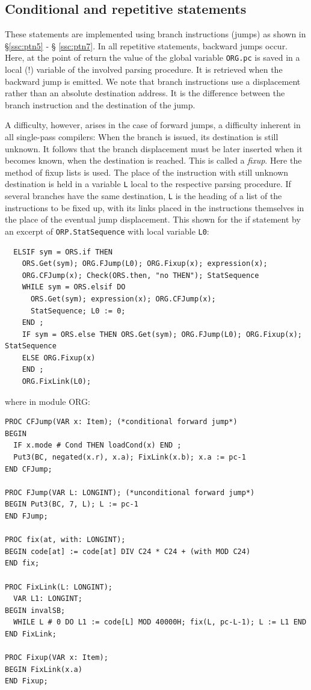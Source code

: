 \subsection{Conditional and repetitive statements}
These statements are implemented using branch instructions (jumps) as shown in \S \ref{ssc:ptn5} - \S
\ref{ssc:ptn7}. In all repetitive statements, backward jumps occur. Here, at the point of return the
value of the global variable \verb|ORG.pc| is saved in a local (!) variable of the involved parsing
procedure. It is retrieved when the backward jump is emitted. We note that branch instructions use
a displacement rather than an absolute destination address. It is the difference between the branch
instruction and the destination of the jump.

A difficulty, however, arises in the case of forward jumps, a difficulty inherent in all single-pass
compilers: When the branch is issued, its destination is still unknown. It follows that the branch
displacement must be later inserted when it becomes known, when the destination is reached. This
is called a \emph{fixup}. Here the method of fixup lists is used. The place of the instruction with
still unknown destination is held in a variable \verb|L| local to the respective parsing procedure.
If several branches have the same destination, \verb|L| is the heading of a list of the instructions
to be fixed up, with its links placed in the instructions themselves in the place of the eventual jump
displacement. This shown for the if statement by an excerpt of \verb|ORP.StatSequence| with local
variable \verb|L0|:
\begin{verbatim}
  ELSIF sym = ORS.if THEN
    ORS.Get(sym); ORG.FJump(L0); ORG.Fixup(x); expression(x);
    ORG.CFJump(x); Check(ORS.then, "no THEN"); StatSequence
    WHILE sym = ORS.elsif DO
      ORS.Get(sym); expression(x); ORG.CFJump(x);
      StatSequence; L0 := 0;
    END ;
    IF sym = ORS.else THEN ORS.Get(sym); ORG.FJump(L0); ORG.Fixup(x); StatSequence
    ELSE ORG.Fixup(x)
    END ;
    ORG.FixLink(L0);
\end{verbatim}

where in module ORG:
\begin{verbatim}
PROC CFJump(VAR x: Item); (*conditional forward jump*)
BEGIN
  IF x.mode # Cond THEN loadCond(x) END ;
  Put3(BC, negated(x.r), x.a); FixLink(x.b); x.a := pc-1
END CFJump;

PROC FJump(VAR L: LONGINT); (*unconditional forward jump*)
BEGIN Put3(BC, 7, L); L := pc-1
END FJump;

PROC fix(at, with: LONGINT);
BEGIN code[at] := code[at] DIV C24 * C24 + (with MOD C24)
END fix;

PROC FixLink(L: LONGINT);
  VAR L1: LONGINT;
BEGIN invalSB;
  WHILE L # 0 DO L1 := code[L] MOD 40000H; fix(L, pc-L-1); L := L1 END
END FixLink;

PROC Fixup(VAR x: Item);
BEGIN FixLink(x.a)
END Fixup;
\end{verbatim}

